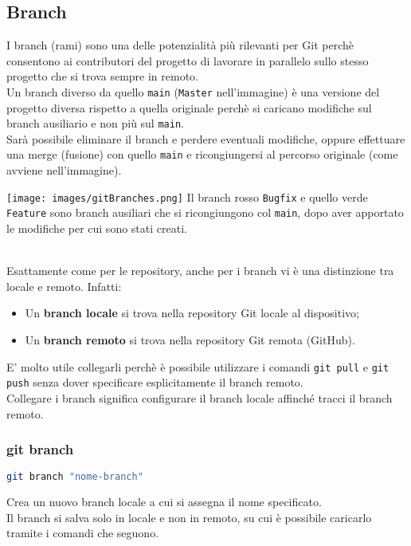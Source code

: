 \newpage
\subsection{Branch}
\nosyllab
\begin{minipage}{.48\textwidth}
	I branch (rami) sono una delle potenzialità più rilevanti per Git perchè consentono ai contributori del progetto di lavorare in parallelo sullo stesso progetto che si trova sempre in remoto.\\
	Un branch diverso da quello \texttt{main} (\texttt{Master} nell'immagine) è una versione del progetto diversa rispetto a quella originale perchè si caricano modifiche sul branch ausiliario e non più sul \texttt{main}.\\
	Sarà possibile eliminare il branch e perdere eventuali modifiche, oppure effettuare una merge (fusione) con quello \texttt{main} e ricongiungersi al percorso originale (come avviene nell'immagine).
\end{minipage}
\hfil
\begin{minipage}{.48\textwidth}
	\texttt{[image: images/gitBranches.png]}
	Il branch rosso \texttt{Bugfix} e quello verde \texttt{Feature} sono branch ausiliari che si ricongiungono col \texttt{main}, dopo aver apportato le modifiche per cui sono stati creati.
\end{minipage}
\syllab
\vspace{.3cm}\\
Esattamente come per le repository, anche per i branch vi è una distinzione tra locale e remoto. Infatti:
\begin{itemize}[noitemsep, topsep=3pt]
	\item Un \textbf{branch locale} si trova nella repository Git locale al dispositivo;
	\item Un \textbf{branch remoto} si trova nella repository Git remota (GitHub).
\end{itemize}
E' molto utile collegarli perchè è possibile utilizzare i comandi \texttt{git pull} e \texttt{git push} senza dover specificare esplicitamente il branch remoto.\\
Collegare i branch significa configurare il branch locale affinché tracci il branch remoto.

\subsubsection{git branch}
\begin{lstlisting}[language=bash]
	git branch "nome-branch"
\end{lstlisting}
Crea un nuovo branch locale a cui si assegna il nome specificato.\\
Il branch si salva solo in locale e non in remoto, su cui è possibile caricarlo tramite i comandi che seguono.\\

